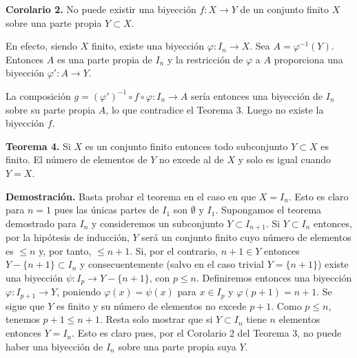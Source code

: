 \textbf{Corolario 2.} No puede existir una biyección \( f: X \to Y \) de un conjunto finito \( X \) sobre una parte propia \( Y \subset X \).

En efecto, siendo \( X \) finito, existe una biyección \( \varphi: I_n \to X \). Sea \( A = \varphi^{-1}(Y) \). Entonces \( A \) es una parte propia de \( I_n \) y la restricción de \( \varphi \) a \( A \) proporciona una biyección \( \varphi': A \to Y \).

\begin{center}
\end{center}

La composición \( g = (\varphi')^{-1} \circ f \circ \varphi: I_n \to A \) sería entonces una biyección de \( I_n \) sobre su parte propia \( A \), lo que contradice el Teorema 3. Luego no existe la biyección \( f \).

\textbf{Teorema 4.} Si \( X \) es un conjunto finito entonces todo subconjunto \( Y \subset X \) es finito. El número de elementos de \( Y \) no excede al de \( X \) y solo es igual cuando \( Y = X \).

\textbf{Demostración.} Basta probar el teorema en el caso en que \( X = I_n \). Esto es claro para \( n = 1 \) pues las únicas partes de \( I_1 \) son \( \emptyset \) y \( I_1 \). Supongamos el teorema demostrado para \( I_n \) y consideremos un subconjunto \( Y \subset I_{n+1} \). Si \( Y \subset I_n \) entonces, por la hipótesis de inducción, \( Y \) será un conjunto finito cuyo número de elementos es \( \leq n \) y, por tanto, \( \leq n + 1 \). Si, por el contrario, \( n + 1 \in Y \) entonces \( Y - \{n + 1\} \subset I_n \) y consecuentemente (salvo en el caso trivial \( Y = \{n + 1\} \)) existe una biyección \( \psi: I_p \to Y - \{n + 1\} \), con \( p \leq n \). Definiremos entonces una biyección \( \varphi: I_{p+1} \to Y \), poniendo \( \varphi(x) = \psi(x) \) para \( x \in I_p \) y \( \varphi(p + 1) = n + 1 \). Se sigue que \( Y \) es finito y su número de elementos no excede \( p + 1 \). Como \( p \leq n \), tenemos \( p + 1 \leq n + 1 \). Resta solo mostrar que si \( Y \subset I_n \) tiene \( n \) elementos entonces \( Y = I_n \). Esto es claro pues, por el Corolario 2 del Teorema 3, no puede haber una biyección de \( I_n \) sobre una parte propia suya \( Y \).

